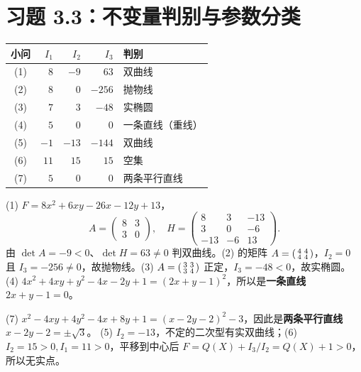 \section{习题 3.3：不变量判别与参数分类}

\begin{center}\small
\begin{tabular}{@{}c r r r l@{}}\toprule
小问 & $I_1$ & $I_2$ & $I_3$ & 判别\\
\midrule
(1) & $8$ & $-9$ & $63$ & 双曲线 \\
(2) & $8$ & $0$ & $-256$ & 抛物线 \\
(3) & $7$ & $3$ & $-48$ & 实椭圆 \\
(4) & $5$ & $0$ & $0$ & 一条直线（重线） \\
(5) & $-1$ & $-13$ & $-144$ & 双曲线 \\
(6) & $11$ & $15$ & $15$ & 空集 \\
(7) & $5$ & $0$ & $0$ & 两条平行直线 \\
\bottomrule
\end{tabular}
\end{center}
 (1) $F=8x^2+6xy-26x-12y+13$，
\[
A=\begin{pmatrix}8&3\\3&0\end{pmatrix},\quad
H=\begin{pmatrix}8&3&-13\\3&0&-6\\-13&-6&13\end{pmatrix}.
\]
由 $\det A=-9<0$、$\det H=63\ne0$ 判双曲线。(2) 的矩阵 $A=\begin{psmallmatrix}4&4\\4&4\end{psmallmatrix}$，$I_2=0$ 且 $I_3=-256\ne0$，故抛物线。(3) $A=\begin{psmallmatrix}3&3\\3&4\end{psmallmatrix}$ 正定，$I_3=-48<0$，故实椭圆。
 (4) $4x^2+4xy+y^2-4x-2y+1=(2x+y-1)^2$，所以是\textbf{一条直线} $2x+y-1=0$。\par
(7) $x^2-4xy+4y^2-4x+8y+1=(x-2y-2)^2-3$，因此是\textbf{两条平行直线} $x-2y-2=\pm\sqrt3$。
 (5) $I_2=-13$，不定的二次型有实双曲线；(6) $I_2=15>0,I_1=11>0$，平移到中心后 $F=Q(X)+I_3/I_2=Q(X)+1>0$，所以无实点。

